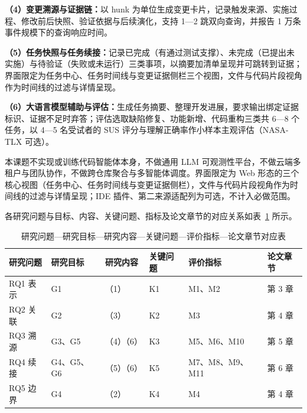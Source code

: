 \textbf{（4）变更溯源与证据链：}以 hunk 为单位生成变更卡片，记录触发来源、实施过程、修改前后快照、验证依据与后续演化，支持 1—2 跳双向查询，并报告 1 万条事件规模下的查询响应时间。

\textbf{（5）任务快照与任务续接：}记录已完成（有通过测试支撑）、未完成（已提出未实施）与待验证（失败或未运行）三类事项，以摘要加清单呈现并可跳转到证据；界面限定为任务中心、任务时间线与变更证据侧栏三个视图，文件与代码片段视角作为时间线的过滤与详情呈现。

\textbf{（6）大语言模型辅助与评估：}生成任务摘要、整理开发进展，要求输出绑定证据标识、证据不足时弃答；评估选取缺陷修复、功能新增、代码重构三类共 6—8 个任务，以 4—5 名受试者的 SUS 评分与理解正确率作小样本主观评估（NASA-TLX 可选）。


本课题不实现或训练代码智能体本身，不做通用 LLM 可观测性平台，不做云端多租户与团队协作，不做跨仓库聚合与多智能体调度。界面限定为 Web 形态的三个核心视图（任务中心、任务时间线与变更证据侧栏），文件与代码片段视角作为时间线的过滤与详情呈现；IDE 插件、第二来源适配列为可选，不计入必做范围。


各研究问题与目标、内容、关键问题、指标及论文章节的对应关系如表~\ref{tab:rq-map} 所示。

\begin{table}[H]
  \centering
  \caption{研究问题—研究目标—研究内容—关键问题—评价指标—论文章节对应表}
  \label{tab:rq-map}
  \begin{tabularx}{\linewidth}{@{}>{\centering\arraybackslash}p{2.1cm}>{\centering\arraybackslash}p{2.4cm}>{\centering\arraybackslash}p{2.0cm}>{\centering\arraybackslash}p{1.6cm}>{\centering\arraybackslash}X>{\centering\arraybackslash}p{1.7cm}@{}}
    \toprule
    研究问题 & 研究目标 & 研究内容 & 关键问题 & 评价指标 & 论文章节 \\
    \midrule
    RQ1 表示 & G1 & （1） & K1 & M1、M2 & 第 3 章 \\
    RQ2 关联 & G2 & （3） & K2 & M3 & 第 4 章 \\
    RQ3 溯源 & G3、G5 & （4）（6） & K3 & M5、M6、M10 & 第 5 章 \\
    RQ4 续接 & G4、G5、G6 & （5）（6） & K5 & M7、M8、M9、M11 & 第 6 章 \\
    RQ5 边界 & G4 & （2） & K4 & M4 & 第 4 章 \\
    \bottomrule
  \end{tabularx}
\end{table}

